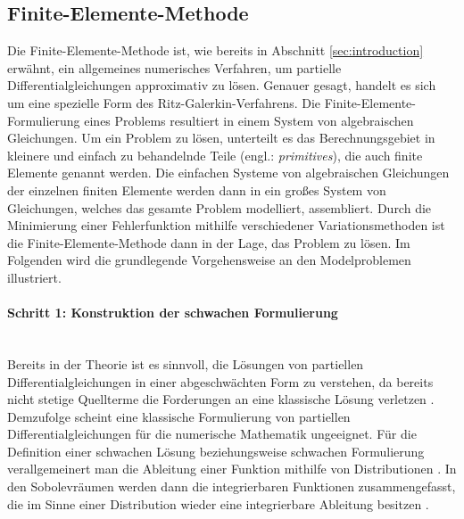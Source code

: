 \documentclass[crop=false]{standalone}
\begin{document}


    \subsection{Finite-Elemente-Methode} %
    \label{sub:finite_elemente_methode}
      Die Finite-Elemente-Methode ist, wie bereits in Abschnitt \ref{sec:introduction} erwähnt, ein allgemeines numerisches Verfahren, um partielle Differentialgleichungen approximativ zu lösen.
      Genauer gesagt, handelt es sich um eine spezielle Form des Ritz-Galerkin-Verfahrens.
      Die Finite-Elemente-Formulierung eines Problems resultiert in einem System von algebraischen Gleichungen.
      Um ein Problem zu lösen, unterteilt es das Berechnungsgebiet in kleinere und einfach zu behandelnde Teile (engl.: \textit{primitives}), die auch finite Elemente genannt werden.
      Die einfachen Systeme von algebraischen Gleichungen der einzelnen finiten Elemente werden dann in ein großes System von Gleichungen, welches das gesamte Problem modelliert, assembliert.
      Durch die Minimierung einer Fehlerfunktion mithilfe verschiedener Variationsmethoden ist die Finite-Elemente-Methode dann in der Lage, das Problem zu lösen.
      Im Folgenden wird die grundlegende Vorgehensweise an den Modelproblemen illustriert.

      \paragraph{Schritt 1: Konstruktion der schwachen Formulierung} %
      \label{par:schritt_1_konstruktion_der_schwachen_formulierung}
        \hfill\\
        Bereits in der Theorie ist es sinnvoll, die Lösungen von partiellen Differentialgleichungen in einer abgeschwächten Form zu verstehen, da bereits nicht stetige Quellterme die Forderungen an eine klassische Lösung verletzen \cite[S.~46]{Schweizer2013}.
        Demzufolge scheint eine klassische Formulierung von partiellen Differentialgleichungen für die numerische Mathematik ungeeignet.
        Für die Definition einer schwachen Lösung beziehungsweise schwachen Formulierung verallgemeinert man die Ableitung einer Funktion mithilfe von Distributionen \cite[S.~46~ff]{Schweizer2013}.
        In den Sobolevräumen werden dann die integrierbaren Funktionen zusammengefasst, die im Sinne einer Distribution wieder eine integrierbare Ableitung besitzen \cite[S.~54~ff]{Schweizer2013}.
\end{document}
